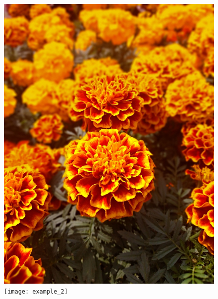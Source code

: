 \documentclass[12pt, letterpaper]{article}
\begin{document}
\begin{figure}[!ht]
    \centering
    \begin{minipage}{0.22\textwidth}
        \includegraphics[width=\textwidth]{example_0}
        \texttt{[image: example\_2]}

\end{minipage}
\end{figure}
\end{document}
